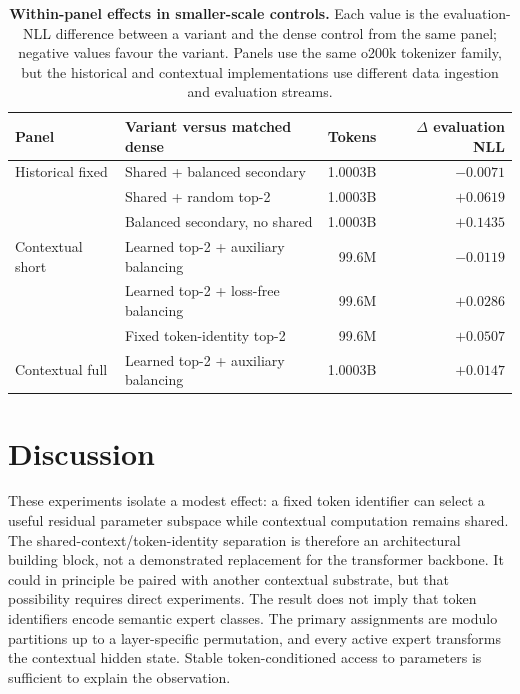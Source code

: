 \documentclass[11pt]{article}
\begin{document}
\begin{table}[t]
\centering
\scriptsize
\setlength{\tabcolsep}{4pt}
\caption{\textbf{Within-panel effects in smaller-scale controls.} Each value is the evaluation-NLL difference between a variant and the dense control from the same panel; negative values favour the variant. Panels use the same o200k tokenizer family, but the historical and contextual implementations use different data ingestion and evaluation streams.}
\label{tab:controls}
\begin{tabular}{llrr}
\toprule
Panel & Variant versus matched dense & Tokens & $\Delta$ evaluation NLL \\
\midrule
Historical fixed & Shared + balanced secondary & 1.0003B & $\mathbf{-0.0071}$ \\
& Shared + random top-2 & 1.0003B & $+0.0619$ \\
& Balanced secondary, no shared & 1.0003B & $+0.1435$ \\
\addlinespace
Contextual short & Learned top-2 + auxiliary balancing & 99.6M & $\mathbf{-0.0119}$ \\
& Learned top-2 + loss-free balancing & 99.6M & $+0.0286$ \\
& Fixed token-identity top-2 & 99.6M & $+0.0507$ \\
\addlinespace
Contextual full & Learned top-2 + auxiliary balancing & 1.0003B & $+0.0147$ \\
\bottomrule
\end{tabular}
\end{table}

\section*{Discussion}

These experiments isolate a modest effect: a fixed token identifier can select a useful residual parameter subspace while contextual computation remains shared. The shared-context/token-identity separation is therefore an architectural building block, not a demonstrated replacement for the transformer backbone. It could in principle be paired with another contextual substrate, but that possibility requires direct experiments. The result does not imply that token identifiers encode semantic expert classes. The primary assignments are modulo partitions up to a layer-specific permutation, and every active expert transforms the contextual hidden state. Stable token-conditioned access to parameters is sufficient to explain the observation.
\end{document}
